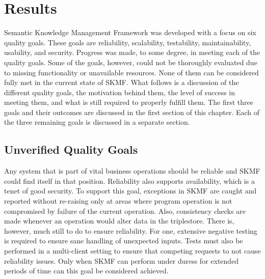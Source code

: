 \chapter{Results}
\label{result}

Semantic Knowledge Management Framework was developed with a focus on six quality goals. These goals are reliability, scalability, testability, maintainability, usability, and security. Progress was made, to some degree, in meeting each of the quality goals. Some of the goals, however, could not be thoroughly evaluated due to missing functionality or unavailable resources. None of them can be considered fully met in the current state of SKMF. What follows is a discussion of the different quality goals, the motivation behind them, the level of success in meeting them, and what is still required to properly fulfill them. The first three goals and their outcomes are discussed in the first section of this chapter. Each of the three remaining goals is discussed in a separate section.


\section{Unverified Quality Goals}
\label{result:unverified}

Any system that is part of vital business operations should be reliable and SKMF could find itself in that position. Reliability also supports availability, which is a tenet of good security. To support this goal, exceptions in SKMF are caught and reported without re-raising only at areas where program operation is not compromised by failure of the current operation. Also, consistency checks are made whenever an operation would alter data in the triplestore. There is, however, much still to do to ensure reliability. For one, extensive negative testing is required to ensure sane handling of unexpected inputs. Tests must also be performed in a multi-client setting to ensure that competing requests to not cause reliability issues. Only when SKMF can perform under duress for extended periods of time can this goal be considered achieved.

